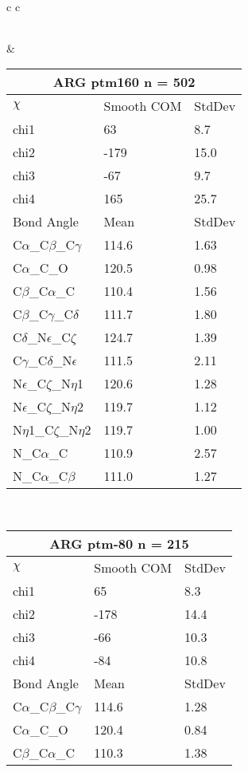 \begin{longtable}{ c c }
\begin{tabular}{ l l l }
  \bottomrule
  \end{tabular}
  &
  \begin{tabular}{ l l l }
  \toprule
  \multicolumn{3}{c}{ARG \textbf{ptm160} n = 502} \\ \toprule
  $\chi$       & Smooth COM & StdDev \\ \midrule
  chi1 & 63 & 8.7 \\ 
  chi2 & -179 & 15.0 \\ 
  chi3 & -67 & 9.7 \\ 
  chi4 & 165 & 25.7 \\ \midrule
  Bond Angle   & Mean     & StdDev \\ \midrule
  C$\alpha$\_C$\beta$\_C$\gamma$ & 114.6 & 1.63\\
  C$\alpha$\_C\_O & 120.5 & 0.98\\
  C$\beta$\_C$\alpha$\_C & 110.4 & 1.56\\
  C$\beta$\_C$\gamma$\_C$\delta$ & 111.7 & 1.80\\
  C$\delta$\_N$\epsilon$\_C$\zeta$ & 124.7 & 1.39\\
  C$\gamma$\_C$\delta$\_N$\epsilon$ & 111.5 & 2.11\\
  N$\epsilon$\_C$\zeta$\_N$\eta$1 & 120.6 & 1.28\\
  N$\epsilon$\_C$\zeta$\_N$\eta$2 & 119.7 & 1.12\\
  N$\eta$1\_C$\zeta$\_N$\eta$2 & 119.7 & 1.00\\
  N\_C$\alpha$\_C & 110.9 & 2.57\\
  N\_C$\alpha$\_C$\beta$ & 111.0 & 1.27\\
  \bottomrule
  \end{tabular}
  \\
  \begin{tabular}{ l l l }
  \toprule
  \multicolumn{3}{c}{ARG \textbf{ptm-80} n = 215} \\ \toprule
  $\chi$       & Smooth COM & StdDev \\ \midrule
  chi1 & 65 & 8.3 \\ 
  chi2 & -178 & 14.4 \\ 
  chi3 & -66 & 10.3 \\ 
  chi4 & -84 & 10.8 \\ \midrule
  Bond Angle   & Mean     & StdDev \\ \midrule
  C$\alpha$\_C$\beta$\_C$\gamma$ & 114.6 & 1.28\\
  C$\alpha$\_C\_O & 120.4 & 0.84\\
  C$\beta$\_C$\alpha$\_C & 110.3 & 1.38\\

\end{tabular}
\end{longtable}
